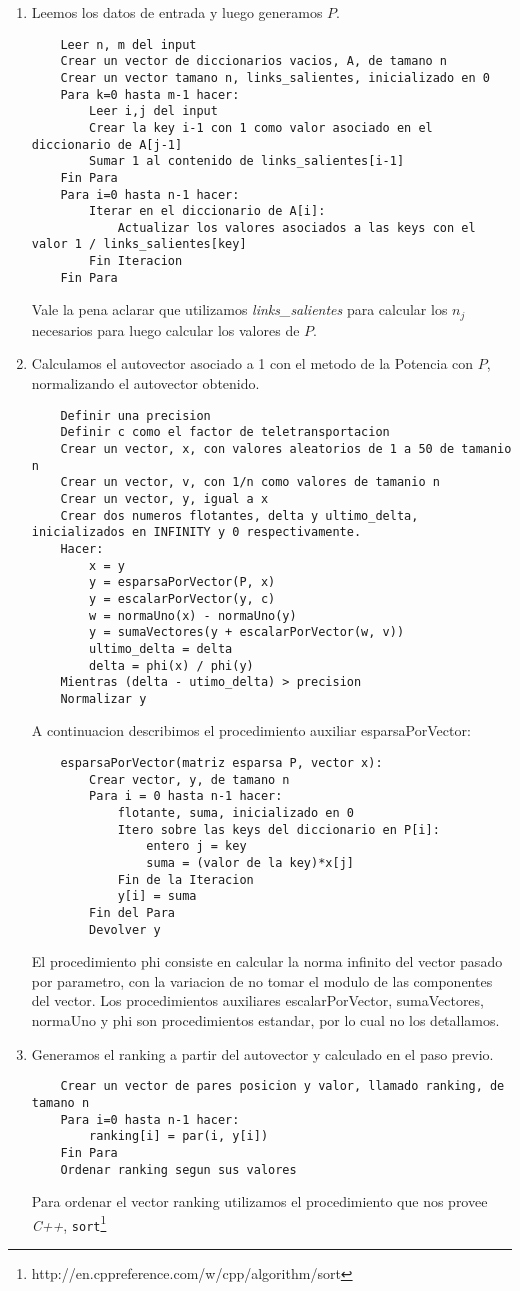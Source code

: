 \begin{enumerate}
	\item Leemos los datos de entrada y luego generamos $P$.
	\begin{lstlisting}
	Leer n, m del input
	Crear un vector de diccionarios vacios, A, de tamano n
	Crear un vector tamano n, links_salientes, inicializado en 0
	Para k=0 hasta m-1 hacer:
		Leer i,j del input
		Crear la key i-1 con 1 como valor asociado en el diccionario de A[j-1]
		Sumar 1 al contenido de links_salientes[i-1]
	Fin Para
	Para i=0 hasta n-1 hacer:
		Iterar en el diccionario de A[i]:
			Actualizar los valores asociados a las keys con el valor 1 / links_salientes[key]
		Fin Iteracion
	Fin Para
	\end{lstlisting}
	Vale la pena aclarar que utilizamos \textit{links_salientes} para calcular los $n_j$ necesarios para luego calcular los valores de $P$.

	\item Calculamos el autovector asociado a 1 con el metodo de la Potencia con $P$, normalizando el autovector obtenido.
	\begin{lstlisting}
	Definir una precision
	Definir c como el factor de teletransportacion
	Crear un vector, x, con valores aleatorios de 1 a 50 de tamanio n
	Crear un vector, v, con 1/n como valores de tamanio n
	Crear un vector, y, igual a x
	Crear dos numeros flotantes, delta y ultimo_delta, inicializados en INFINITY y 0 respectivamente.
	Hacer:
		x = y
		y = esparsaPorVector(P, x)
		y = escalarPorVector(y, c)
		w = normaUno(x) - normaUno(y)
		y = sumaVectores(y + escalarPorVector(w, v))
		ultimo_delta = delta
		delta = phi(x) / phi(y)
	Mientras (delta - utimo_delta) > precision
	Normalizar y
	\end{lstlisting}
	A continuacion describimos el procedimiento auxiliar esparsaPorVector:
	\begin{lstlisting}
	esparsaPorVector(matriz esparsa P, vector x):
		Crear vector, y, de tamano n
		Para i = 0 hasta n-1 hacer:
			flotante, suma, inicializado en 0
			Itero sobre las keys del diccionario en P[i]:
				entero j = key
				suma = (valor de la key)*x[j]
			Fin de la Iteracion
			y[i] = suma
		Fin del Para
		Devolver y
	\end{lstlisting}
	El procedimiento phi consiste en calcular la norma infinito del vector pasado por parametro, con la variacion de no tomar el modulo de las componentes del vector.
	Los procedimientos auxiliares escalarPorVector, sumaVectores, normaUno y phi son procedimientos estandar, por lo cual no los detallamos.

	\item Generamos el ranking a partir del autovector y calculado en el paso previo.
	\begin{lstlisting}
	Crear un vector de pares posicion y valor, llamado ranking, de tamano n
	Para i=0 hasta n-1 hacer:
		ranking[i] = par(i, y[i])
	Fin Para
	Ordenar ranking segun sus valores
	\end{lstlisting}
	Para ordenar el vector ranking utilizamos el procedimiento que nos provee \textit{C++},  \texttt{sort}\footnote{http://en.cppreference.com/w/cpp/algorithm/sort}


\end{enumerate}

